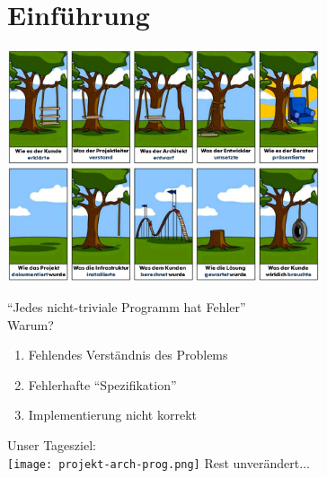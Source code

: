 \documentclass[aspectratio=169]{beamer}
\begin{document}
\section{Einführung}
\begin{frame}
  \begin{center}
    \includegraphics[width=9.2cm]{projekt-schaukel-baum.png}
  \end{center}
\end{frame}
\begin{frame}
  \begin{center}
    \Large{``Jedes nicht-triviale Programm hat Fehler''}\\
    \pause
    \vfill
    \Large{Warum?}
    \pause
  \end{center}
  \vfill
  \begin{enumerate}
    \item Fehlendes Verständnis des Problems
    \pause
    \item Fehlerhafte ``Spezifikation''
    \pause
    \item Implementierung nicht korrekt
  \end{enumerate}
\end{frame}
\begin{frame}
  \begin{center}
    \Large{Unser Tagesziel:}\\
    \vfill
    \texttt{[image: projekt-arch-prog.png]}
    \vfill
    \pause
    \Large{Rest unverändert$\ldots$}
  \end{center}
\end{frame}
\end{document}

